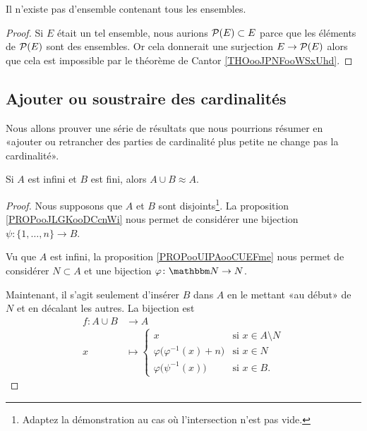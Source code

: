 \begin{corollary}       \label{CORooZMAOooPfJosM}
    Il n'existe pas d'ensemble contenant tous les ensembles.
\end{corollary}

\begin{proof}
    Si \( E\) était un tel ensemble, nous aurions \( \mathcal{P}(E)\subset E\) parce que les éléments de \( \mathcal{P}(E)\) sont des ensembles. Or cela donnerait une surjection \( E\to \mathcal{P}(E)\) alors que cela est impossible par le théorème de Cantor \ref{THOooJPNFooWSxUhd}.
\end{proof}

\subsection{Ajouter ou soustraire des cardinalités}

Nous allons prouver une série de résultats que nous pourrions résumer en  «ajouter ou retrancher des parties de cardinalité plus petite ne change pas la cardinalité».

\begin{lemma}        \label{LEMooUFCAooSyZtZj}
    Si \( A\) est infini et \( B\) est fini, alors \( A\cup B\approx A\).
\end{lemma}

\begin{proof}
    Nous supposons que \( A\) et \( B\) sont disjoints\footnote{Adaptez la démonstration au cas où l'intersection n'est pas vide.}. La proposition \ref{PROPooJLGKooDCcnWi} nous permet de considérer une bijection \( \psi\colon \{ 1,\ldots, n \}\to B\).
    
    Vu que \( A\) est infini, la proposition \ref{PROPooUIPAooCUEFme} nous permet de considérer \( N\subset A\) et une bijection \( \varphi\colon \eN\to N\).

    Maintenant, il s'agit seulement d'insérer \( B\) dans \( A\) en le mettant «au début» de \( N\) et en décalant les autres. La bijection est
    \begin{equation}
        \begin{aligned}
            f\colon A\cup B&\to A \\
            x&\mapsto \begin{cases}
                x    &   \text{si } x\in A\setminus N\\
                \varphi\big( \varphi^{-1}(x)+n \big)    &   \text{si } x\in N\\
                \varphi\big( \psi^{-1}(x) \big)    &    \text{si }x\in B.
            \end{cases}
        \end{aligned}
    \end{equation}
\end{proof}

